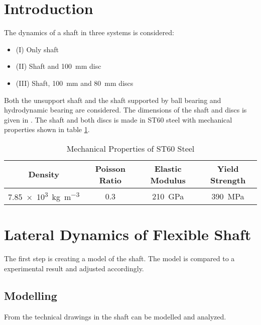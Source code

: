 \section{Introduction}
The dynamics of a shaft in three systems is considered:
\begin{itemize}
    \item (I) Only shaft
    \item (II) Shaft and \SI{100}{\milli \meter} disc
    \item (III) Shaft, \SI{100}{\milli \meter} and \SI{80}{\milli \meter} discs
\end{itemize}
Both the unsupport shaft and the shaft supported by ball bearing and hydrodynamic bearing are considered. The dimensions of the shaft and discs is given in \cite[Appendix]{Problem}.
The shaft and both discs is made in ST60 steel with mechanical properties shown in table \ref{tab:mech_prop}.
\begin{table}[htbp]
    \centering
    \caption{Mechanical Properties of ST60 Steel}
    \label{tab:mech_prop}
    \begin{tabular}{@{}cccc@{}}
        \toprule
        Density                                     &   Poisson Ratio   &   Elastic Modulus         &   Yield Strength \\ \midrule
        \SI{7.85e3}{\kilo \gram \per \cubic \meter} &   0.3             &   \SI{210}{\giga \pascal} &   \SI{390}{\mega \pascal}                               \\ \bottomrule
    \end{tabular}
\end{table}

\section{Lateral Dynamics of Flexible Shaft}
The first step is creating a model of the shaft. The model is compared to a experimental result and adjusted accordingly.

\subsection{Modelling}
From the technical drawings in \cite[Appendix]{Problem} the shaft can be modelled and analyzed.


